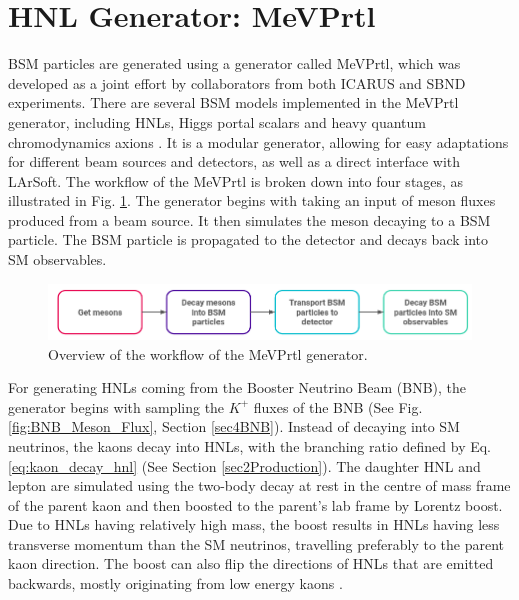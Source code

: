 \section{HNL Generator: MeVPrtl}
\label{sec:gen_mevprtl}

BSM particles are generated using a generator called MeVPrtl, which was developed as a joint effort by collaborators from both ICARUS and SBND experiments.
There are several BSM models implemented in the MeVPrtl generator, including HNLs, Higgs portal scalars \cite{higgs_scalar} and heavy quantum chromodynamics axions \cite{qcd_axion}.
It is a modular generator, allowing for easy adaptations for different beam sources and detectors, as well as a direct interface with LArSoft.
The workflow of the MeVPrtl is broken down into four stages, as illustrated in Fig. \ref{fig:MeVPrtl_Workflow}.
The generator begins with taking an input of meson fluxes produced from a beam source.
It then simulates the meson decaying to a BSM particle.
The BSM particle is propagated to the detector and decays back into SM observables.

\begin{figure}[htbp!] 
\centering    
\includegraphics[width=1.0\textwidth]{MeVPrtl_Workflow}
\caption[MeVPrtl Generator Workflow]{
Overview of the workflow of the MeVPrtl generator.
}
\label{fig:MeVPrtl_Workflow}
\end{figure}

For generating HNLs coming from the Booster Neutrino Beam (BNB), the generator begins with sampling the $K^{+}$ fluxes of the BNB (See Fig. \ref{fig:BNB_Meson_Flux}, Section \ref{sec4BNB}).
Instead of decaying into SM neutrinos, the kaons decay into HNLs, with the branching ratio defined by Eq. \ref{eq:kaon_decay_hnl} (See Section \ref{sec2Production}).
The daughter HNL and lepton are simulated using the two-body decay at rest in the centre of mass frame of the parent kaon and then boosted to the parent's lab frame by Lorentz boost.
Due to HNLs having relatively high mass, the boost results in HNLs having less transverse momentum than the SM neutrinos, travelling preferably to the parent kaon direction.
The boost can also flip the directions of HNLs that are emitted backwards, mostly originating from low energy kaons \cite{DavidePhD}.

